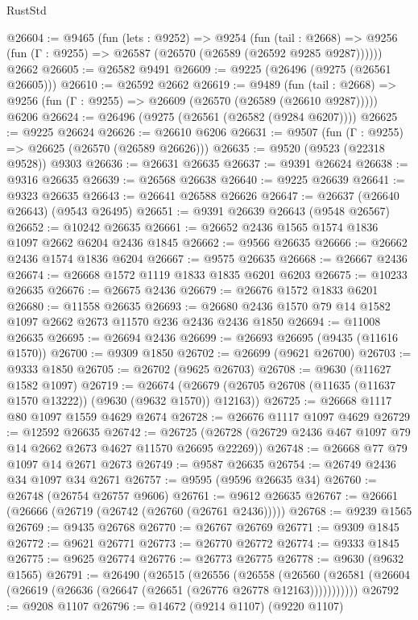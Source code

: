 \begin{lexlean}{RustStd}
\begin{coremodule}
@26604 := @9465
    (fun (lets : @9252) =>
    @9254
      (fun (tail : @2668) =>
      @9256 (fun (Γ : @9255) => @26587 (@26570 (@26589 (@26592 @9285 @9287))))))
    @2662
@26605 := @26582 @9491
@26609 := @9225 (@26496 (@9275 (@26561 @26605)))
@26610 := @26592 @2662
@26619 := @9489
    (fun (tail : @2668) => @9256 (fun (Γ : @9255) => @26609 (@26570 (@26589 (@26610 @9287)))))
    @6206
@26624 := @26496 (@9275 (@26561 (@26582 (@9284 @6207))))
@26625 := @9225 @26624
@26626 := @26610 @6206
@26631 := @9507 (fun (Γ : @9255) => @26625 (@26570 (@26589 @26626)))
@26635 := @9520 (@9523 (@22318 @9528)) @9303
@26636 := @26631 @26635
@26637 := @9391 @26624
@26638 := @9316 @26635
@26639 := @26568 @26638
@26640 := @9225 @26639
@26641 := @9323 @26635
@26643 := @26641 @26588 @26626
@26647 := @26637 (@26640 @26643) (@9543 @26495)
@26651 := @9391 @26639 @26643 (@9548 @26567)
@26652 := @10242 @26635
@26661 := @26652 @2436 @1565 @1574 @1836 @1097 @2662 @6204 @2436 @1845
@26662 := @9566 @26635
@26666 := @26662 @2436 @1574 @1836 @6204
@26667 := @9575 @26635
@26668 := @26667 @2436
@26674 := @26668 @1572 @1119 @1833 @1835 @6201 @6203
@26675 := @10233 @26635
@26676 := @26675 @2436
@26679 := @26676 @1572 @1833 @6201
@26680 := @11558 @26635
@26693 := @26680 @2436 @1570 @79 @14 @1582 @1097 @2662 @2673 @11570 @236 @2436 @2436 @1850
@26694 := @11008 @26635
@26695 := @26694 @2436
@26699 := @26693 @26695 (@9435 (@11616 @1570))
@26700 := @9309 @1850
@26702 := @26699 (@9621 @26700)
@26703 := @9333 @1850
@26705 := @26702 (@9625 @26703)
@26708 := @9630 (@11627 @1582 @1097)
@26719 := @26674
    (@26679 (@26705 @26708 (@11635 (@11637 @1570 @13222)) (@9630 (@9632 @1570)) @12163))
@26725 := @26668 @1117 @80 @1097 @1559 @4629 @2674
@26728 := @26676 @1117 @1097 @4629
@26729 := @12592 @26635
@26742 := @26725 (@26728 (@26729 @2436 @467 @1097 @79 @14 @2662 @2673 @4627 @11570 @26695 @22269))
@26748 := @26668 @77 @79 @1097 @14 @2671 @2673
@26749 := @9587 @26635
@26754 := @26749 @2436 @34 @1097 @34 @2671
@26757 := @9595 (@9596 @26635 @34)
@26760 := @26748 (@26754 @26757 @9606)
@26761 := @9612 @26635
@26767 := @26661 (@26666 (@26719 (@26742 (@26760 (@26761 @2436)))))
@26768 := @9239 @1565
@26769 := @9435 @26768
@26770 := @26767 @26769
@26771 := @9309 @1845
@26772 := @9621 @26771
@26773 := @26770 @26772
@26774 := @9333 @1845
@26775 := @9625 @26774
@26776 := @26773 @26775
@26778 := @9630 (@9632 @1565)
@26791 := @26490
    (@26515
      (@26556
        (@26558
          (@26560 (@26581 (@26604 (@26619 (@26636 (@26647 (@26651 (@26776 @26778 @12163)))))))))))
@26792 := @9208 @1107
@26796 := @14672 (@9214 @1107) (@9220 @1107)

\end{coremodule}
\end{lexlean}
